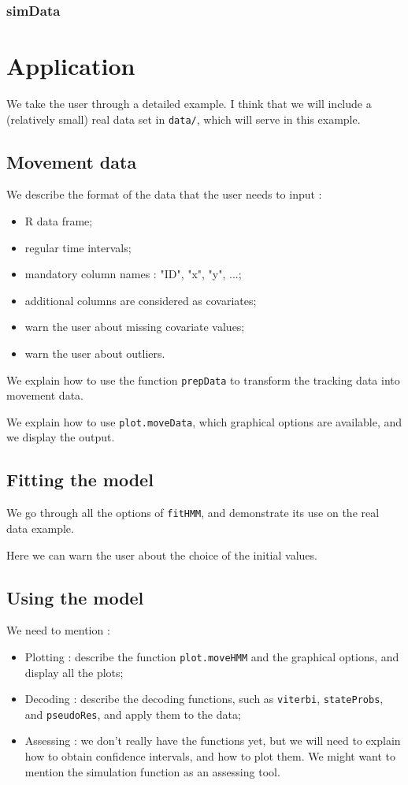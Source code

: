 \documentclass[]{article}
\begin{document}
\subsubsection{simData}


\section{Application} \label{application}
We take the user through a detailed example. I think that we will include a (relatively small) real data set in \texttt{data/}, which will serve in this example.

\subsection{Movement data}
We describe the format of the data that the user needs to input :
\begin{itemize}
	\item R data frame;
	\item regular time intervals;
	\item mandatory column names : "ID", "x", "y", ...;
	\item additional columns are considered as covariates;
	\item warn the user about missing covariate values;
	\item warn the user about outliers.
\end{itemize}

We explain how to use the function \texttt{prepData} to transform the tracking data into movement data.

We explain how to use \texttt{plot.moveData}, which graphical options are available, and we display the output.

\subsection{Fitting the model}
We go through all the options of \texttt{fitHMM}, and demonstrate its use on the real data example.

Here we can warn the user about the choice of the initial values.

\subsection{Using the model}
We need to mention :
\begin{itemize}
	\item Plotting : describe the function \texttt{plot.moveHMM} and the graphical options, and display all the plots;
	\item Decoding : describe the decoding functions, such as \texttt{viterbi}, \texttt{stateProbs}, and \texttt{pseudoRes}, and apply them to the data;
	\item Assessing : we don't really have the functions yet, but we will need to explain how to obtain confidence intervals, and how to plot them. We might want to mention the simulation function as an assessing tool.
\end{itemize}
\end{document}
